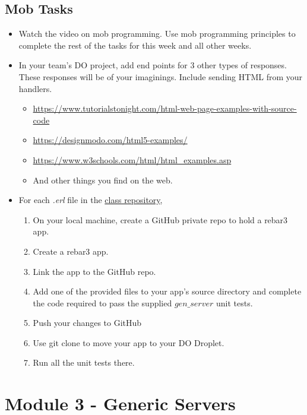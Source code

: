 \documentclass[12pt]{amsart}
\begin{document}
	\subsection*{Mob Tasks}
		\begin{itemize}
			\item Watch the video on mob programming. Use mob programming principles to complete the rest of the tasks for this week and all other weeks.
			\item In your team's DO project, add end points for $3$ other types of responses. These responses will be of your imaginings. Include sending HTML from your handlers.
			\begin{itemize}
				\item \url{https://www.tutorialstonight.com/html-web-page-examples-with-source-code}
				\item \url{https://designmodo.com/html5-examples/}
				\item \url{https://www.w3schools.com/html/html_examples.asp}
				\item And other things you find on the web.
			\end{itemize}
			\item For each \emph{.erl} file in the \href{https://github.com/yenrab/ErlangTutorialTasks}{class repository},
			\begin{enumerate}
            			\item On your local machine, create a GitHub private repo to hold a rebar3 app.
            			\item Create a rebar3 app.
            			\item Link the app to the GitHub repo.
            			\item Add one of the provided files to your app's source directory and complete the code required to pass the supplied $gen\_server$ unit tests.
            			\item Push your changes to GitHub
            			\item Use git clone to move your app to your DO Droplet.
            			\item Run all the unit tests there.
			\end{enumerate}
		\end{itemize}
	
\section*{Module 3 - Generic Servers } 
	
\end{document}
